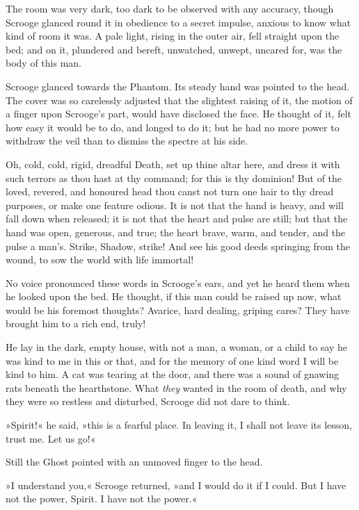 The room was very dark, too dark to be observed with any accuracy, though Scrooge glanced round it in obedience to a secret impulse, anxious to know what kind of room it was. A pale light, rising in the outer air, fell straight upon the bed; and on it, plunder\-ed and bereft, unwatched, unwept, uncared for, was the body of this man.

Scrooge glanced towards the Phantom. Its steady hand was pointed to the head. The cover was so carelessly adjusted that the slightest raising of it, the motion of a finger upon Scrooge's part, would have disclosed the face. He thought of it, felt how easy it would be to do, and longed to do it; but he had no more power to withdraw the veil than to dismiss the spectre at his side.

Oh, cold, cold, rigid, dreadful Death, set up thine altar here, and dress it with such terrors as thou hast at thy command; for this is thy dominion! But of the loved, revered, and honoured head thou canst not turn one hair to thy dread purposes, or make one feature odious. It is not that the hand is heavy, and will fall down when released; it is not that the heart and pulse are still; but that the hand was open, generous, and true; the heart brave, warm, and tender, and the pulse a man's. Strike, Shadow, strike! And see his good deeds springing from the wound, to sow the world with life immortal!

No voice pronounced these words in Scrooge's ears, and yet he heard them when he looked upon the bed. He thought, if this man could be raised up now, what would be his foremost thoughts? Avarice, hard dealing, griping cares? They have brought him to a rich end, truly!

He lay in the dark, empty house, with not a man, a woman, or a child to say he was kind to me in this or that, and for the memory of one kind word I will be kind to him. A cat was tearing at the door, and there was a sound of gnawing rats beneath the hearthstone. What \textit{they} wanted in the room of death, and why they were so restless and disturbed, Scrooge did not dare to think.

»Spirit!« he said, »this is a fearful place. In leaving it, I shall not leave its lesson, trust me. Let us go!«

Still the Ghost pointed with an unmoved finger to the head.

»I understand you,« Scrooge returned, »and I would do it if I could. But I have not the power, Spirit. I have not the power.«

